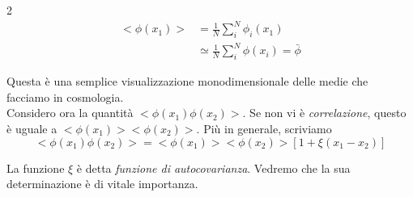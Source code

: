 \documentclass{report}
\begin{document}
{\begin{multicols}{2}
    \begin{align}
        <\phi(x_1)> &= \frac{1}{N}\sum_i^N\phi_i(x_1) \\
        &\simeq \frac{1}{N}\sum_i^N\phi(x_i) = \bar{\phi}
    \end{align}
    
\end{multicols}


Questa è una semplice visualizzazione monodimensionale delle medie che facciamo in cosmologia. \\

Considero ora la quantità $<\phi(x_1)\phi(x_2)>$. Se non vi è \emph{correlazione}, questo è uguale a $<\phi(x_1)><\phi(x_2)>$. Più in generale, scriviamo 
\begin{equation}
    <\phi(x_1)\phi(x_2)> = <\phi(x_1)><\phi(x_2)>\left[1 +  \xi(x_1 - x_2)\right]
\end{equation}

La funzione $\xi$ è detta \emph{funzione di autocovarianza}. Vedremo che la sua determinazione è di vitale importanza. \\
    
}
\end{document}

